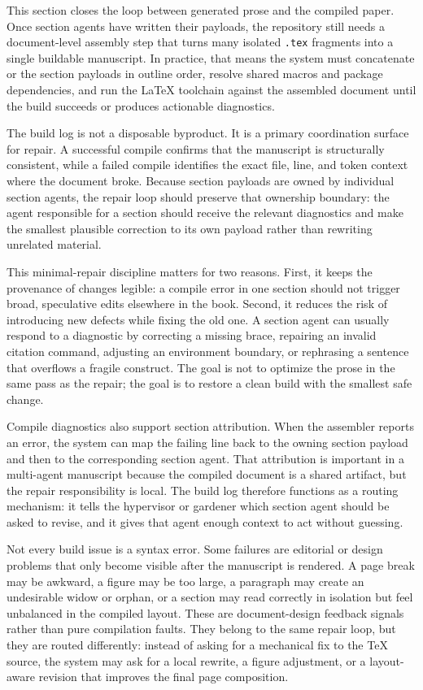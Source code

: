 This section closes the loop between generated prose and the compiled paper. Once section agents have written their payloads, the repository still needs a document-level assembly step that turns many isolated \texttt{.tex} fragments into a single buildable manuscript. In practice, that means the system must concatenate or \texttt{} the section payloads in outline order, resolve shared macros and package dependencies, and run the LaTeX toolchain against the assembled document until the build succeeds or produces actionable diagnostics.

The build log is not a disposable byproduct. It is a primary coordination surface for repair. A successful compile confirms that the manuscript is structurally consistent, while a failed compile identifies the exact file, line, and token context where the document broke. Because section payloads are owned by individual section agents, the repair loop should preserve that ownership boundary: the agent responsible for a section should receive the relevant diagnostics and make the smallest plausible correction to its own payload rather than rewriting unrelated material.

This minimal-repair discipline matters for two reasons. First, it keeps the provenance of changes legible: a compile error in one section should not trigger broad, speculative edits elsewhere in the book. Second, it reduces the risk of introducing new defects while fixing the old one. A section agent can usually respond to a diagnostic by correcting a missing brace, repairing an invalid citation command, adjusting an environment boundary, or rephrasing a sentence that overflows a fragile construct. The goal is not to optimize the prose in the same pass as the repair; the goal is to restore a clean build with the smallest safe change.

Compile diagnostics also support section attribution. When the assembler reports an error, the system can map the failing line back to the owning section payload and then to the corresponding section agent. That attribution is important in a multi-agent manuscript because the compiled document is a shared artifact, but the repair responsibility is local. The build log therefore functions as a routing mechanism: it tells the hypervisor or gardener which section agent should be asked to revise, and it gives that agent enough context to act without guessing.

Not every build issue is a syntax error. Some failures are editorial or design problems that only become visible after the manuscript is rendered. A page break may be awkward, a figure may be too large, a paragraph may create an undesirable widow or orphan, or a section may read correctly in isolation but feel unbalanced in the compiled layout. These are document-design feedback signals rather than pure compilation faults. They belong to the same repair loop, but they are routed differently: instead of asking for a mechanical fix to the TeX source, the system may ask for a local rewrite, a figure adjustment, or a layout-aware revision that improves the final page composition.

